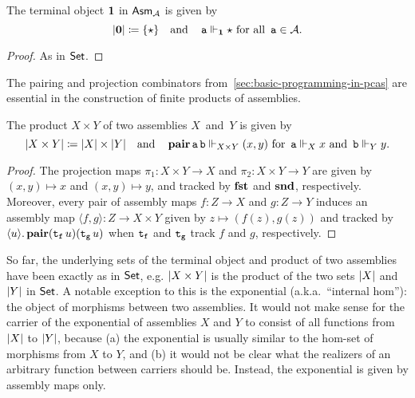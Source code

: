 \begin{proposition}
  The terminal object \(\mathbf 1\) in \(\mathsf{Asm}_{\mathcal A}\) is given by
  \[
    \lvert\mathbf 0\rvert \coloneq \{\star\}
    \quad
    \text{and}
    \quad
    \operatorname{\mathtt{a}} \Vdash_\mathbf 1 \star
    \text{ for all } \operatorname{\mathtt{a}} \in \mathcal A.
  \]
\end{proposition}
\begin{proof}
  As in \(\mathsf{Set}\).
\end{proof}

The pairing and projection combinators from~\cref{sec:basic-programming-in-pcas}
are essential in the construction of finite products of assemblies.

\begin{proposition}[Products]
  The product \(X \times Y\) of two assemblies \(X\)~and~\(Y\) is given by
  \[
    \lvert X \times Y\rvert \coloneq \lvert X\rvert \times \lvert Y\rvert
    \quad\text{and}\quad
    \operatorname{\mathbf{pair}}\operatorname{\mathtt{a}}\operatorname{\mathtt{b}} \Vdash_{X \times Y} (x,y)
    \text{ for }
    \operatorname{\mathtt{a}} \Vdash_X x
    \text{ and }
    \operatorname{\mathtt{b}} \Vdash_Y y.
  \]
\end{proposition}
\begin{proof}
  The projection maps \(\pi_1 \colon X \times Y \to X\) and
  \(\pi_2 \colon X \times Y \to Y\) are given by \((x,y) \mapsto x\) and
  \((x,y) \mapsto y\), and tracked by \(\operatorname{\mathbf{fst}}\) and \(\operatorname{\mathbf{snd}}\), respectively.
  Moreover, every pair of assembly maps \(f \colon Z \to X\) and
  \(g \colon Z \to Y\) induces an assembly map
  \(\langle f,g\rangle \colon Z \to X \times Y\) given by
  \(z \mapsto (f(z),g(z))\) and tracked by
  \(\langle{{u}}\rangle.\,{\operatorname{\mathbf{pair}}(\operatorname{\mathtt{t_f}}u)(\operatorname{\mathtt{t_g}}u)}\) when \(\operatorname{\mathtt{t_f}}\) and
  \(\operatorname{\mathtt{t_g}}\) track \(f\) and \(g\), respectively.
\end{proof}

So far, the underlying sets of the terminal object and product of two assemblies
have been exactly as in \(\mathsf{Set}\), e.g. \(\lvert X \times Y\rvert\) is the product
of the two sets \(\lvert X\rvert\) and \(\lvert Y\rvert\) in \(\mathsf{Set}\).
%
A notable exception to this is the exponential (a.k.a.\ ``internal hom''):
the object of morphisms between two assemblies.
%
It would not make sense for the carrier of the exponential of assemblies \(X\)
and \(Y\) to consist of all functions from \(\lvert X\rvert\) to \(\lvert Y\rvert\),
because (a) the exponential is usually similar to the hom-set of morphisms from
\(X\) to \(Y\), and (b) it would not be clear what the realizers of an arbitrary
function between carriers should be.
%
Instead, the exponential is given by assembly maps only.

